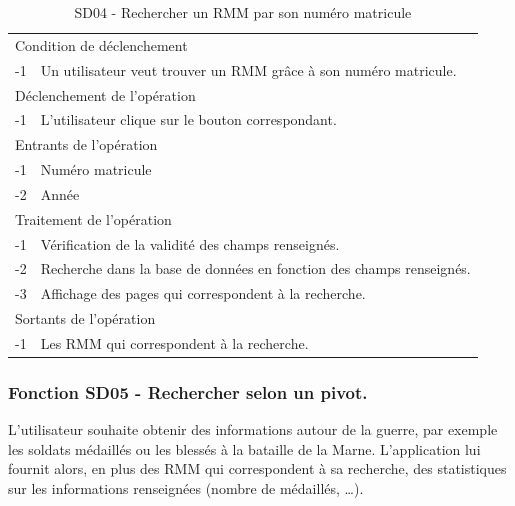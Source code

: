 \documentclass[a4paper]{article}
\begin{document}
\begin{table}[H]
  \centering
   \small
	\begin{tabular}{|c|p{12cm}|}
   		\hline
   			\rowcolor{lightgray}\multicolumn{2}{|c|}{\textbf{SD04 - Rechercher un RMM par son numéro matricule}} \\
   		\hline
   			\multicolumn{2}{|l|}{Condition de d\'eclenchement} \\
   		\hline
   			-1 & Un utilisateur veut trouver un RMM grâce à son numéro matricule. \\
   		\hline
   			\multicolumn{2}{|l|}{D\'eclenchement de l'op\'eration} \\
   		\hline
   			-1 & L'utilisateur clique sur le bouton correspondant. \\
   		\hline
   			\multicolumn{2}{|l|}{Entrants de l'op\'eration} \\
   		\hline
   			-1 & Numéro matricule \\
            -2 & Année \\
   		\hline
   			\multicolumn{2}{|l|}{Traitement de l'op\'eration} \\
  		\hline
  			-1 & Vérification de la validité des champs renseignés. \\
   			-2 & Recherche dans la base de données en fonction des champs renseignés. \\
        	-3 & Affichage des pages qui correspondent à la recherche. \\
   		\hline
   			\multicolumn{2}{|l|}{Sortants de l'op\'eration} \\
   		\hline
   			-1 & Les RMM qui correspondent à la recherche. \\
   		\hline
	\end{tabular}
  \caption{SD04 - Rechercher un RMM par son numéro matricule}
  \normalsize
  \label{tab:SD04}
\end{table}

\subsubsection{Fonction SD05 - Rechercher selon un pivot.}

L'utilisateur souhaite obtenir des informations autour de la guerre, par exemple les soldats médaillés ou les blessés à la bataille de la Marne. L'application lui fournit alors, en plus des RMM qui correspondent à sa recherche, des statistiques sur les informations renseignées (nombre de médaillés, \ldots).
\\
\end{document}
